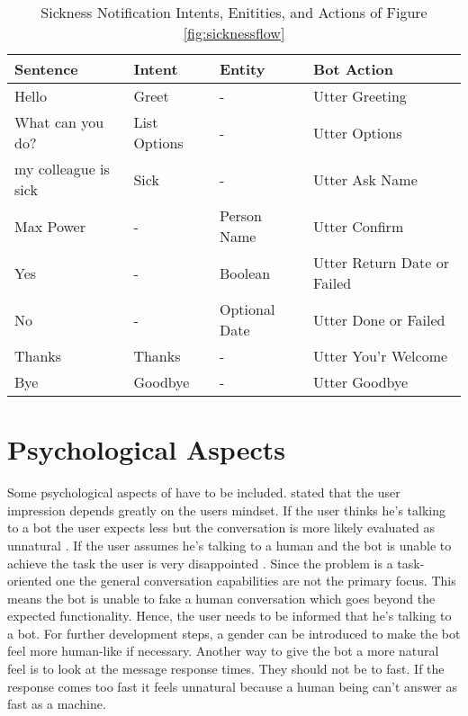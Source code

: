  \begin{table}[h]
    \centering
    \begin{tabular}{ l | l | l | l }
        Sentence & Intent & Entity & Bot Action \\ \hline \hline
        Hello & Greet & - & Utter Greeting \\ \hline
        What can you do? & List Options & - & Utter Options \\ \hline
        my colleague is sick & Sick & - & Utter Ask Name \\ \hline
        Max Power & - & Person Name & Utter Confirm \\ \hline
        Yes & - & Boolean & Utter Return Date or Failed \\ \hline
        No & - & Optional Date & Utter Done or Failed \\ \hline
        Thanks & Thanks & - & Utter You'r Welcome \\ \hline
        Bye & Goodbye & - & Utter Goodbye 
    \end{tabular}
    \caption{Sickness Notification Intents, Enitities, and Actions of Figure \ref{fig:sicknessflow}} \label{tab:sick_data}
\end{table} \noindent

\section{Psychological Aspects}
Some psychological aspects of \citet{brandtzaeg2018chatbots} have to be included.
\citet{brandtzaeg2018chatbots} stated that the user impression depends greatly on the users mindset.
If the user thinks he's talking to a bot the user expects less but the conversation is more likely evaluated as unnatural \cite{brandtzaeg2018chatbots}. If the user assumes he's talking to a human and the bot is unable to achieve the task the user is very disappointed \cite{brandtzaeg2018chatbots}.
Since the problem is a task-oriented one the general conversation capabilities are not the primary focus.
This means the bot is unable to fake a human conversation which goes beyond the expected functionality.
Hence, the user needs to be informed that he's talking to a bot.
For further development steps, a gender can be introduced to make the bot feel more human-like if necessary.
Another way to give the bot a more natural feel is to look at the message response times.
They should not be to fast.
If the response comes too fast it feels unnatural because a human being can't 
answer as fast as a machine.

